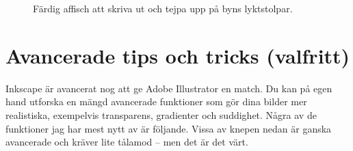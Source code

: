 \documentclass[a4paper,final]{memoir} %
\begin{document}
\begin{figure}[htb] 
\noindent{}
\smallskip
\caption{Färdig affisch att skriva ut och tejpa upp på byns lyktstolpar.}
\end{figure}

\section{Avancerade tips och tricks (valfritt)}

Inkscape är avancerat nog att ge Adobe Illustrator en match. Du kan på egen hand utforska en mängd avancerade funktioner som gör dina bilder mer realistiska, exempelvis transparens, gradienter och suddighet. Några av de funktioner jag har mest nytt av är följande. Vissa av knepen nedan är ganska avancerade och kräver lite tålamod -- men det är det värt.
\end{document}

